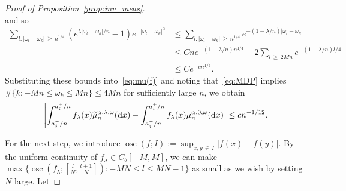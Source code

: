 \documentclass[AHL,Unicode,longabstracts,published]{cedram}
\DeclareMathOperator*{\osc}{osc}
\newcommand{\dd}{\text{\upshape{d}}}
\let\oldtilde\tilde
\renewcommand*{\tilde}[1]{\mathchoice{\widetilde{#1}}{\widetilde{#1}}{\oldtilde{#1}}{\oldtilde{#1}}}
\begin{document}
\begin{proof}[Proof of Proposition~\ref{prop:inv_meas}]
\[\]
and so
\begin{align*}
\sum_{l\colon |\omega_l-\omega_k|\,\ge\,n^{1/4}}\left(e^{\lambda|\omega_l-\omega_k|/n}-1\right)e^{-|\omega_l-\omega_k|^\alpha} &\le \sum_{l\colon |\omega_l-\omega_k|\,\ge\,n^{1/4}}e^{-(1-\lambda/n)|\omega_l-\omega_k|}\\
&\le Cn e^{-(1-\lambda/n)n^{1/4}}+2\sum_{l\,\geq\,2Mn}e^{-(1-\lambda/n)l/4}\\
&\leq C e^{-cn^{1/4}}.
\end{align*}
Substituting these bounds into~\eqref{eq:mu(f)} and noting that~\eqref{eq:MDP} implies $\#\{k\colon -Mn \le \omega_k \le Mn\} \le 4M n$ for sufficiently large $n$, we obtain
\begin{align}\label{eq:inv_meas1st}
\left|\int_{a_j^-/n}^{a_i^+/n} f_\lambda(x)\tilde{\mu}_n^{\alpha,\lambda,\omega}(\dd x) -\int_{a_j^-/n}^{a_i^+/n} f_\lambda(x)\mu_n^{\alpha,0,\omega}(\dd x)\right| \le c n^{-1/12}.
\end{align}

For the next step, we introduce $\osc(f;I) := \sup_{x,y\,\in\,I}|f(x)-f(y)|$. By the uniform continuity of $f_\lambda\in C_b[-M,M]$, we can make $\max\{\osc(f_\lambda;[\tfrac{l}{N}, \tfrac{l+1}{N}])\colon -MN\le l \le MN-1\}$ as small as we wish by setting $N$ large. Let


\end{proof}
\end{document}

